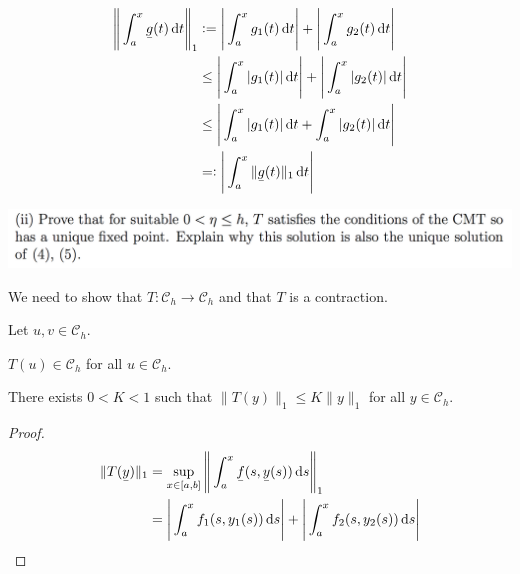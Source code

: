 \documentclass[12pt]{article}
\newcommand{\Ch}{\mathcal{C}_h}
\begin{document}
\begin{align*}
  \Bigg\| \int_a^x \ubar{g}(t) \dt \Bigg\|_1
  &  := \Bigg| \int_a^x g_1(t) \dt \Bigg| +
        \Bigg| \int_a^x g_2(t) \dt \Bigg|\\
  &\leq \Bigg| \int_a^x |g_1(t)| \dt \Bigg| +
        \Bigg| \int_a^x |g_2(t)| \dt \Bigg|\\
  &\leq \Bigg| \int_a^x |g_1(t)| \dt        +
               \int_a^x |g_2(t)| \dt \Bigg|\\
  &  =: \Bigg| \int_a^x \|\ubar{g}(t)\|_1 \dt \Bigg|
\end{align*}

\begin{mdframed}
\includegraphics[width=400pt]{img/differential-equations-a1-2-1-2.png}
\end{mdframed}

We need to show that $T:\Ch \to \Ch$ and that $T$ is a contraction.

Let $u,v \in \Ch$.

\begin{claim*}
  $T(u) \in \Ch$ for all $u \in \Ch$.
\end{claim*}



\begin{claim*}
  There exists $0 < K < 1$ such that $\|T(y)\|_1 \leq K\|y\|_1$ for all $y \in \Ch$.
\end{claim*}

\begin{proof}
  \begin{align*}
    \|T(\ubar{y})\|_1
    &   = \sup_{x \in [a,b]} \Bigg\|\int_a^x \ubar{f}(s, \ubar{y}(s)) \ds \Bigg\|_1\\
    &   = \Bigg|\int_a^x f_1(s, y_1(s)) \ds \Bigg| +
          \Bigg|\int_a^x f_2(s, y_2(s)) \ds \Bigg|
  \end{align*}
\end{proof}
\end{document}
